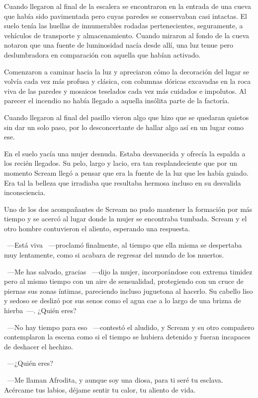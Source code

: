 Cuando llegaron al final de la escalera se encontraron en la entrada de una cueva que había sido pavimentada pero cuyas paredes se conservaban casi intactas. El suelo tenía las huellas de innumerables rodadas pertenecientes, seguramente, a vehículos de transporte y almacenamiento. Cuando miraron al fondo de la cueva notaron que una fuente de luminosidad nacía desde allí, una luz tenue pero deslumbradora en comparación con aquella que habían activado.

Comenzaron a caminar hacia la luz y apreciaron cómo la decoración del lugar se volvía cada vez más profusa y clásica, con columnas dóricas excavadas en la roca viva de las paredes y mosaicos teselados cada vez más cuidados e impolutos. Al parecer el incendio no había llegado a aquella insólita parte de la factoría.

Cuando llegaron al final del pasillo vieron algo que hizo que se quedaran quietos sin dar un solo paso, por lo desconcertante de hallar algo así en un lugar como ese.

En el suelo yacía una mujer desnuda. Estaba desvanecida y ofrecía la espalda a los recién llegados. Su pelo, largo y lacio, era tan resplandeciente que por un momento Scream llegó a pensar que era la fuente de la luz que les había guiado. Era tal la belleza que irradiaba que resultaba hermosa incluso en su desvalida inconsciencia.

Uno de los dos acompañantes de Scream no pudo mantener la formación por más tiempo y se acercó al lugar donde la mujer se encontraba tumbada. Scream y el otro hombre contuvieron el aliento, esperando una respuesta.

~---Está viva ~---proclamó finalmente, al tiempo que ella misma se despertaba muy lentamente, como si acabara de regresar del mundo de los muertos.

~---Me has salvado, gracias ~---dijo la mujer, incorporándose con extrema timidez pero al mismo tiempo con un aire de sensualidad, protegiendo con un cruce de piernas sus zonas íntimas, pareciendo incluso juguetona al hacerlo. Su cabello liso y sedoso se deslizó por sus senos como el agua cae a lo largo de una brizna de hierba~---. ¿Quién eres?

~---No hay tiempo para eso ~---contestó el aludido, y Scream y su otro compañero contemplaron la escena como si el tiempo se hubiera detenido y fueran incapaces de deshacer el hechizo.

~---¿Quién eres?

~---Me llaman Afrodita, y aunque soy una diosa, para ti seré tu esclava. Acércame tus labios, déjame sentir tu calor, tu aliento de vida.

